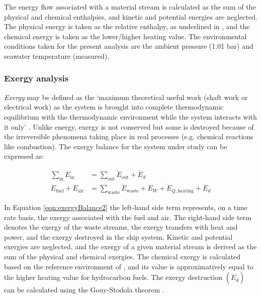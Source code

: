 \documentclass[preprint,12pt]{elsarticle}
\begin{document}
The energy flow associated with a material stream is calculated as the sum of the physical and chemical enthalpies, and kinetic and potential energies are neglected. The physical energy is taken as the relative enthalpy, as underlined in \cite{Kotas2013}, and the chemical energy is taken as the lower/higher heating value. The environmental conditions taken for the present analysis are the ambient pressure (1.01 bar) and seawater temperature (measured).

\subsubsection{Exergy analysis}

\emph{Exergy} may be defined as the `maximum theoretical useful work (shaft work or electrical work) as the system is brought into complete thermodynamic equilibrium with the thermodynamic environment while the system interacts with it only' \cite{Tsatsaronis2007}. Unlike energy, exergy is not conserved but some is destroyed because of the irreversible phenomena taking place in real processes (e.g. chemical reactions like combustion). The exergy balance for the system under study can be expressed as:

\begin{align}
	\sum_{\mathrm{in}} \dot{E}_{\mathrm{in}} &= \sum_{\mathrm{out}} \dot{E}_{\mathrm{out}} +\dot{E}_{d} \label{eqn:exergyBalance} \\
	\dot{E}_{\mathrm{fuel}} + \dot{E}_{\mathrm{air}} &= \sum_{{\mathrm{waste}}}\dot{E}_{{\mathrm{waste}}}+\dot{E}_{W}+\dot{E}_{Q,\mathrm{heating}}+\dot{E}_{d}  \label{eqn:exergyBalance2}
\end{align}


In Equation \ref{eqn:exergyBalance2} the left-hand side term represents, on a time rate basis, the exergy associated with the fuel and air. The right-hand side term denotes the exergy of the waste streams, the exergy transfers with heat and power, and the exergy destroyed in the ship system. Kinetic and potential exergies are neglected, and the exergy of a given material stream is derived as the sum of the physical and chemical exergies. The chemical exergy is calculated based on the reference environment of \cite{Szargut1989}, and its value is approximatively equal to the higher heating value for hydrocarbon fuels. The exergy destruction $(\dot{E}_d)$ can be calculated using the Gouy-Stodola theorem \cite{Kotas2013}.    
\end{document}
